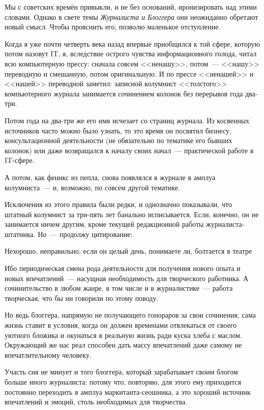 Мы с советских времён привыкли, и не без оснований, иронизировать над этими словами. Однако в свете темы \textit{Журналиста и Блоггера} они неожиданно обретают новый смысл. Чтобы прояснить его, позволю маленькое отступление.

Когда я уже почти четверть века назад впервые приобщился к той сфере, которую потом назовут IT, я, вследствие острого чувства информационного голода, читал всю компьютерную прессу: сначала совсем <<ненашу>>, потом~--- <<нашу>> переводную и смешанную, потом оригинальную. И по прессе <<ненашей>> и <<нашей>> переводной заметил: записной колумнист <<толстого>> компьютерного журнала занимается сочинением колонок без перерывов года два-три.

Потом года на два-три же его имя исчезает со страниц журнала. Из косвенных источников часто можно было узнать, то это время он посвятил бизнесу, консультационной деятельности (не обязательно по тематике его бывших колонок) или даже возвращался к началу своих начал~--- практической работе в IT-сфере.

А потом, как феникс из пепла, снова появлялся в журнале в амплуа колумниста~--- и, возможно, по совсем другой тематике.

Исключения из этого правила были редки, и однозначно показывали, что штатный колумнист за три-пять лет банально исписывается. Если, конечно, он не занимается ничем другим, кроме текущей редакционной работы журналиста-штатника. Но~--- продолжу цитирование:


\begin{shadequote}{}
Нехорошо, неправильно, если он целый день, понимаете ли, болтается в театре
\end{shadequote}

Ибо периодическая смена рода деятельности для получения нового опыта и новых впечатлений~--- насущная необходимость для творческого работника. А сочинительство в любом жанре, в том числе и в журналистике~--- работа творческая, что бы ни говорили по этому поводу.

Но ведь блоггера, напрямую не получающего гонораров за свои сочинения, сама жизнь ставит в условия, когда он должен временами отвлекаться от своего уютного бложика и окунаться в реальную жизнь ради куска хлеба с маслом. Окружающий же нас реал способен дать массу впечатлений даже самому не впечатлительному человеку.

Участь сия не минует и того блоггера, который зарабатывает своим блогом больше иного журналиста: потому что, повторяю, для этого ему приходится постоянно переходить в амплуа маркитанта-сеошника, а это хороший источник впечатлений и эмоций, столь необходимых для творчества.

